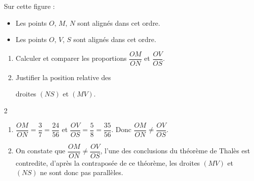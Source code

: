 \begin{exercice*}
    Sur cette figure :
    \begin{itemize}
        \item Les points $O$, $M$, $N$ sont alignés dans cet ordre.
        \item Les points $O$, $V$, $S$ sont alignés dans cet ordre.
    \end{itemize}

    \begin{enumerate}
        \item Calculer et comparer les proportions $\dfrac{OM}{ON}$ et $\dfrac{OV}{OS}$.
        \item Justifier la position relative des 
        
        droites $(NS)$ et $(MV)$.
    \end{enumerate}
    

\end{exercice*}
\begin{corrige}

    \begin{spacing}2
    \begin{enumerate}
        \item $\dfrac{OM}{ON}=\dfrac{3}{7}=\dfrac{24}{56}$ et $\dfrac{OV}{OS}=\dfrac{5}{8}=\dfrac{35}{56}$.        
        Donc $\dfrac{OM}{ON}\neq\dfrac{OV}{OS}$.
        \item On constate que $\dfrac{OM}{ON}\neq\dfrac{OV}{OS}$, l'une des conclusions du théorème de Thalès est contredite, 
        d'après la contraposée de ce théorème, les droites $(MV)$ et $(NS)$ ne sont donc pas parallèles.
    \end{enumerate}
    \end{spacing}

\end{corrige}

